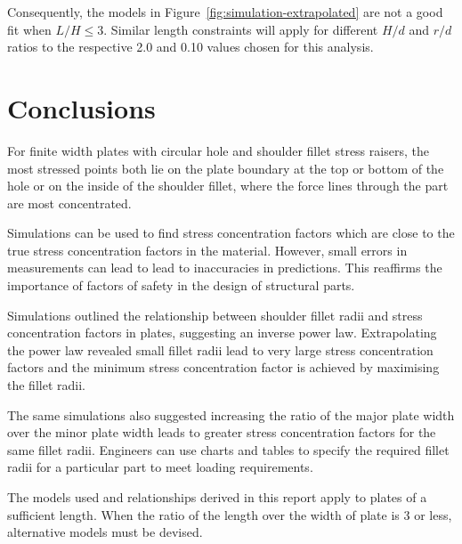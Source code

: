 \documentclass[a4paper,11pt,twocolumn]{article}
\begin{document}
Consequently, the models in Figure~\vref{fig:simulation-extrapolated} are not a
good fit when $L/H \leq 3$. Similar length constraints will apply for different
$H/d$ and $r/d$ ratios to the respective 2.0 and 0.10 values chosen for this
analysis.

\section{Conclusions}

For finite width plates with circular hole and shoulder fillet stress raisers,
the most stressed points both lie on the plate boundary at the top or bottom of
the hole or on the inside of the shoulder fillet, where the force lines through
the part are most concentrated.

Simulations can be used to find stress concentration factors which are close to
the true stress concentration factors in the material. However, small errors in
measurements can lead to lead to inaccuracies in predictions. This reaffirms the
importance of factors of safety in the design of structural parts.

Simulations outlined the relationship between shoulder fillet radii and stress
concentration factors in plates, suggesting an inverse power law. Extrapolating
the power law revealed small fillet radii lead to very large stress
concentration factors and the minimum stress concentration factor is achieved by
maximising the fillet radii.

The same simulations also suggested increasing the ratio of the major plate
width over the minor plate width leads to greater stress concentration factors
for the same fillet radii. Engineers can use charts and tables to specify the
required fillet radii for a particular part to meet loading requirements.

The models used and relationships derived in this report apply to plates of a
sufficient length. When the ratio of the length over the width of plate is 3 or
less, alternative models must be devised.

\printbibliography
\end{document}
